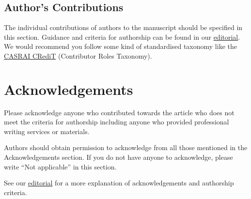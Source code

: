 \documentclass[a4paper,num-refs,gigabyte]{oup-contemporary}
\begin{document}
\subsection{Author's Contributions}

The individual contributions of authors to the manuscript should be specified in this section. Guidance and criteria for authorship can be found in our \href{https://doi.org/10.1093/gigascience/giy122}{editorial}. We would recommend you follow some kind of standardised taxonomy like the \href{http://docs.casrai.org/CRediT}{CASRAI CRediT} (Contributor Roles Taxonomy).


\section{Acknowledgements}

Please acknowledge anyone who contributed towards the article who does not meet the criteria for authorship including anyone who provided professional writing services or materials.

Authors should obtain permission to acknowledge from all those mentioned in the Acknowledgements section. If you do not have anyone to acknowledge, please write ``Not applicable'' in this section.

See our \href{https://doi.org/10.1093/gigascience/giy122}{editorial} for a more explanation of acknowledgements and authorship criteria. 


\end{document}
